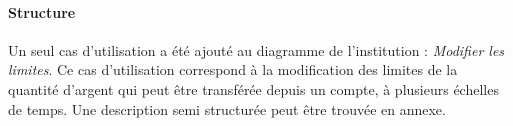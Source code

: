 \paragraph{Structure} Un seul cas d'utilisation a été ajouté au diagramme de l'institution : \emph{Modifier les limites}. Ce cas d'utilisation correspond à la modification des limites de la quantité d'argent qui peut être transférée depuis un compte, à plusieurs échelles de temps. Une description semi structurée peut être trouvée en annexe.